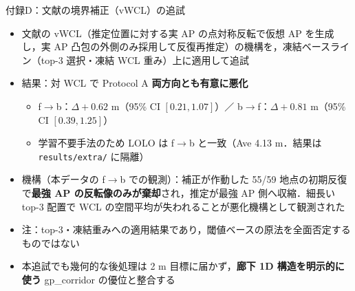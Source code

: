 \documentclass[aspectratio=169,unicode,10pt]{beamer}
\begin{document}
\begin{frame}{付録D：文献の境界補正（vWCL）の追試}
  \small
  \begin{itemize}
    \item 文献\cite{ji2012vap}の vWCL（推定位置に対する実 AP の点対称反転で仮想 AP を生成し，実 AP 凸包の外側のみ採用して反復再推定）の機構を，凍結ベースライン（top-3 選択・凍結 WCL 重み）上に適用して追試
    \item 結果：対 WCL で Protocol A \textbf{両方向とも有意に悪化}
      \begin{itemize}
        \item f$\to$b：$\Delta{+}0.62$ m（95\% CI $[0.21, 1.07]$）／ b$\to$f：$\Delta{+}0.81$ m（95\% CI $[0.39, 1.25]$）
        \item 学習不要手法のため LOLO は f$\to$b と一致（Ave 4.13 m．結果は \texttt{results/extra/} に隔離）
      \end{itemize}
    \item 機構（本データの f$\to$b での観測）：補正が作動した 55/59 地点の初期反復で\textbf{最強 AP の反転像のみが棄却}され，推定が最強 AP 側へ収縮．細長い top-3 配置で WCL の空間平均が失われることが悪化機構として観測された
    \item 注：top-3・凍結重みへの適用結果であり，閾値ベースの原法を全面否定するものではない
    \item 本追試でも幾何的な後処理は 2 m 目標に届かず，\textbf{廊下 1D 構造を明示的に使う} gp\_corridor の優位と整合する
  \end{itemize}
\end{frame}
\end{document}
